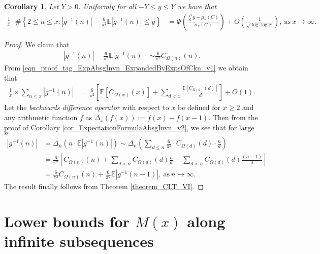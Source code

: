 \documentclass[11pt,reqno,a4letter]{article}
\numberwithin{figure}{section}
\numberwithin{table}{section}
\theoremstyle{plain}
\newtheorem{cor}[theorem]{Corollary}
\numberwithin{theorem}{section}
\theoremstyle{definition}
\begin{document}
\begin{cor} 
\label{cor_CLT_VII} 
Let $Y > 0$. 
Uniformly for all $-Y \leq y \leq Y$ 
we have that 
\begin{align*} 
\frac{1}{x} \cdot \#\left\{2 \leq n \leq x:|g^{-1}(n)| - 
     \frac{6}{\pi^2} \mathbb{E}|g^{-1}(n)| \leq y\right\} & = 
     \Phi\left(\frac{\frac{\pi^2}{6} y - \mu_x(C)}{\sigma_x(C)}\right) + 
     O\left(\frac{1}{\sqrt{\log\log x}}\right), 
     \mathrm{\ as\ } x \rightarrow \infty. 
\end{align*} 
\end{cor} 
\begin{proof} 
We claim that 
\begin{align*} 
|g^{-1}(n)| - \frac{6}{\pi^2} \mathbb{E}|g^{-1}(n)| & \sim \frac{6}{\pi^2} C_{\Omega(n)}(n). 
\end{align*} 
From \eqref{eqn_proof_tag_ExpAbsgInvn_ExpandedByExpsOfCkn_v1}
we obtain that 
\begin{align*} 
\frac{1}{x} \times \sum_{n \leq x} |g^{-1}(n)| & = 
     \frac{6}{\pi^2} \left[\mathbb{E}[C_{\Omega(x)}(x)] + \sum_{d<x} 
     \frac{\mathbb{E}[C_{\Omega(d)}(d)]}{d}\right] + O(1). 
\end{align*} 
Let the \emph{backwards difference operator} with respect to $x$ 
be defined for $x \geq 2$ and any arithmetic function $f$ as 
$\Delta_x(f(x)) := f(x) - f(x-1)$. Then from the proof of 
Corollary \ref{cor_ExpectationFormulaAbsgInvn_v2}, 
we see that for large $n$ 
\begin{align*} 
|g^{-1}(n)| & = \Delta_n(n \cdot \mathbb{E}|g^{-1}(n)|) 
     \sim \Delta_n\left(\sum_{d \leq n} \frac{6}{\pi^2} \cdot C_{\Omega(d)}(d) \cdot \frac{n}{d}\right) \\ 
     & = \frac{6}{\pi^2}\left[C_{\Omega(n)}(n) + \sum_{d < n} C_{\Omega(d)}(d) \frac{n}{d} - 
     \sum_{d<n} C_{\Omega(d)}(d) \frac{(n-1)}{d}\right] \\ 
     & = \frac{6}{\pi^2} C_{\Omega(n)}(n) + \frac{6}{\pi^2} \mathbb{E}|g^{-1}(n-1)|, 
     \mathrm{\ as\ } n \rightarrow \infty. 
\end{align*} 
The result finally follows from Theorem \ref{theorem_CLT_VI}. 
\end{proof} 

\newpage 
\section{Lower bounds for $M(x)$ along infinite subsequences} 
\label{Section_KeyApplications} 
\end{document}
